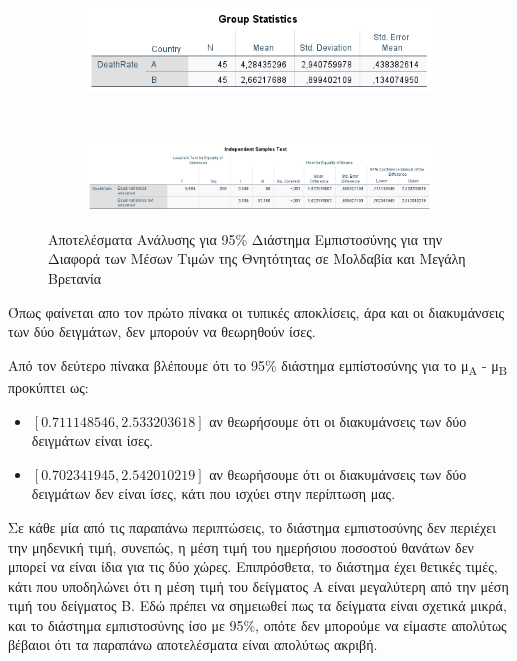 \documentclass{article}
\begin{document}
   \begin{figure}[H]
      \centering
        \begin{subfigure}{0.8\linewidth}
        \centering
          \includegraphics[width=\linewidth]{media/2/means_comparison1.png}
        \end{subfigure}\\
        \begin{subfigure}{1\linewidth}
            \centering
          \includegraphics[width=\linewidth]{media/2/means_comparison2.png}
        \end{subfigure}
      \caption{Αποτελέσματα Ανάλυσης για 95\% Διάστημα Εμπιστοσύνης για την Διαφορά των Μέσων Τιμών της Θνητότητας σε Μολδαβία και Μεγάλη Βρετανία}
      \label{m1_m2_dif}
    \end{figure}
     
     Όπως φαίνεται απο τον πρώτο πίνακα οι τυπικές αποκλίσεις, άρα και οι διακυμάνσεις των δύο δειγμάτων, δεν μπορούν να θεωρηθούν ίσες.
     
     Από τον δεύτερο πίνακα βλέπουμε ότι το 95\% διάστημα εμπίστοσύνης για το μ\textsubscript{A} - μ\textsubscript{Β} προκύπτει ως:
     \begin{itemize}
       \item $ [0.711148546, 2.533203618] $ αν θεωρήσουμε ότι οι διακυμάνσεις των δύο δειγμάτων είναι ίσες.
       \item $ [0.702341945, 2.542010219] $ αν θεωρήσουμε ότι οι διακυμάνσεις των δύο δειγμάτων δεν είναι ίσες, κάτι που ισχύει στην περίπτωση μας.
     \end{itemize}
     
     Σε κάθε μία από τις παραπάνω περιπτώσεις, το διάστημα εμπιστοσύνης δεν περιέχει την μηδενική τιμή, συνεπώς, η μέση τιμή του ημερήσιου ποσοστού θανάτων δεν μπορεί να είναι ίδια για τις δύο χώρες. Επιπρόσθετα, το διάστημα έχει θετικές τιμές, κάτι που υποδηλώνει ότι η μέση τιμή του δείγματος Α είναι μεγαλύτερη από την μέση τιμή του δείγματος Β. Εδώ πρέπει να σημειωθεί πως τα δείγματα είναι σχετικά μικρά, και το διάστημα εμπιστοσύνης ίσο με 95\%, οπότε δεν μπορούμε να είμαστε απολύτως βέβαιοι ότι τα παραπάνω αποτελέσματα είναι απολύτως ακριβή.
    
\end{document}
